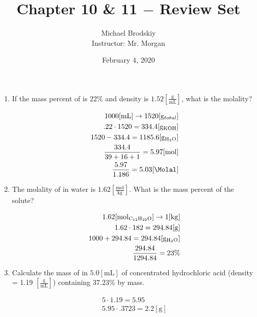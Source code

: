 \documentclass[12pt]{article}
\title{Chapter 10 \& 11 $-$ Review Set}
\date{February 4, 2020}
\author{Michael Brodskiy\\ \small Instructor: Mr. Morgan}
\begin{document}
\maketitle

\begin{enumerate}

  \item If the mass percent of  is 22\% and density is $1.52 \left[ \frac{\si{\gram}}{\si{\milli\liter}} \right]$, what is the molality?   

    \begin{equation}
      \begin{split}
        1000[\si{\milli\liter}]\rightarrow 1520[\si{\gram}_{total}]\\
        .22\cdot1520=334.4[\si{\gram}_{\ce{KOH}}]\\
        1520-334.4=1185.6[\si{\gram}_{\ce{H2O}}]\\
        \frac{334.4}{39+16+1}=5.97[\si{\mole}]\\
        \frac{5.97}{1.186}=5.03[\si{\Molal}]
      \end{split}
      \label{1}
    \end{equation}

  \item The molality of  in water is $1.62\left[ \frac{\si{\mole}}{\si{\kilo\gram}} \right]$.  What is the mass percent of the solute?  

    \begin{equation}
      \begin{split}
        1.62[\si{\mole}_{\ce{C12H22O}}]\rightarrow1[\si{\kilo\gram}]\\
        1.62\cdot182=294.84[\si{\gram}]\\
        1000+294.84=294.84[\si{\gram}_{\ce{H2O}}]\\
        \frac{294.84}{1294.84}=23\%
      \end{split}
      \label{2}
    \end{equation}

  \item Calculate the mass of  in $5.0[\si{\milli\liter}]$ of concentrated hydrochloric acid (density = 1.19 $\left[ \frac{\si{\gram}}{\si{\milli\liter}} \right]$) containing 37.23\%  by mass.

    \begin{equation}
      \begin{split}
        5\cdot1.19=5.95\\
        5.95\cdot.3723=2.2[\si{\gram}]
      \end{split}
      \label{3}
    \end{equation}


\end{enumerate}
\end{document}
